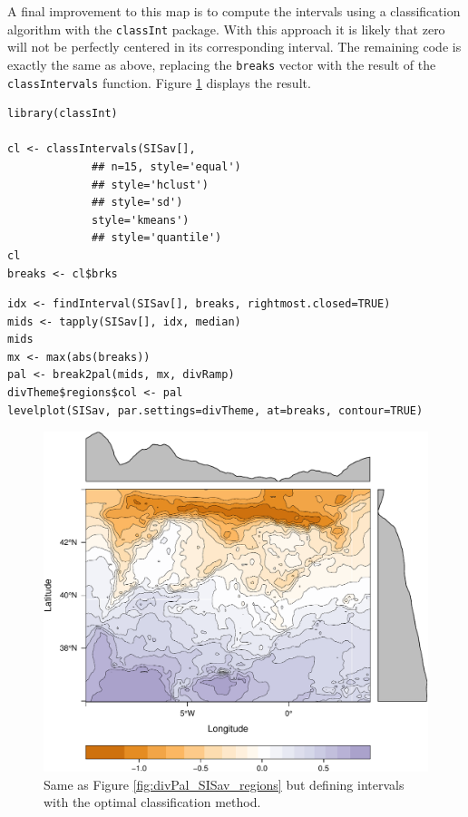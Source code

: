 \documentclass[smallroyalvopaper]{memoir}
\begin{document}
A final improvement to this map is to compute the intervals using a
classification algorithm with the \texttt{classInt} package. With this
approach it is likely that zero will not be perfectly centered in its
corresponding interval. The remaining code is exactly the same as
above, replacing the \texttt{breaks} vector with the result of the
\texttt{classIntervals} function. Figure \ref{fig:divPalSISav_classInt}
displays the result.


\lstset{language=R,numbers=none}
\begin{lstlisting}
library(classInt)

cl <- classIntervals(SISav[],
		     ## n=15, style='equal')
		     ## style='hclust')
		     ## style='sd')
		     style='kmeans')
		     ## style='quantile')
cl
breaks <- cl$brks
\end{lstlisting}

\lstset{language=R,numbers=none}
\begin{lstlisting}
idx <- findInterval(SISav[], breaks, rightmost.closed=TRUE)
mids <- tapply(SISav[], idx, median)
mids
mx <- max(abs(breaks))
pal <- break2pal(mids, mx, divRamp)
divTheme$regions$col <- pal
levelplot(SISav, par.settings=divTheme, at=breaks, contour=TRUE)
\end{lstlisting}

\begin{figure}[htb]
\centering
\includegraphics[width=.9\linewidth]{figs/divPalSISav_classInt.pdf}
\caption{\label{fig:divPalSISav_classInt}Same as Figure \ref{fig:divPal_SISav_regions} but defining intervals with the optimal classification method.}
\end{figure}
\end{document}
